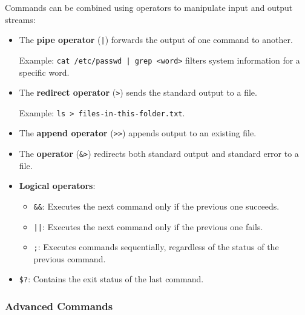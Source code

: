 Commands can be combined using operators to manipulate input and output streams:
\begin{itemize}
    \item The \textbf{pipe operator} (\texttt{|}) forwards the output of one command to another.
    
    Example: \texttt{cat /etc/passwd | grep <word>} filters system information for a specific word.
    
    \item The \textbf{redirect operator} (\texttt{>}) sends the standard output to a file.
    
    Example: \texttt{ls > files-in-this-folder.txt}.
    
    \item The \textbf{append operator} (\texttt{>>}) appends output to an existing file.
    \item The \textbf{operator} (\texttt{\&>}) redirects both standard output and standard error to a file.
    \item \textbf{Logical operators}:
    \begin{itemize}
        \item \texttt{\&\&}: Executes the next command only if the previous one succeeds.
        \item \texttt{||}: Executes the next command only if the previous one fails.
        \item \texttt{;}: Executes commands sequentially, regardless of the status of the previous command.
    \end{itemize}
    \item \texttt{\$?}: Contains the exit status of the last command.
\end{itemize}

\subsubsection{Advanced Commands}

\vspace{-1em}

